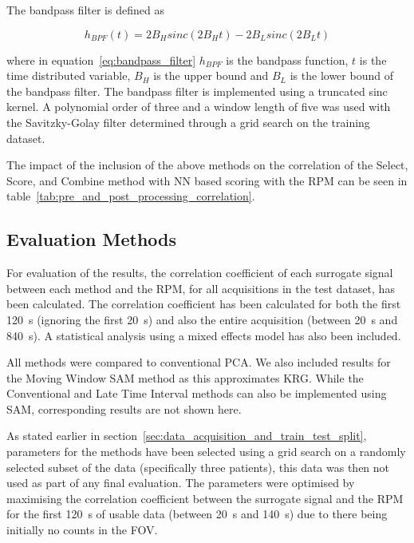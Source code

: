             The bandpass filter is defined as

            \begin{equation} \label{eq:bandpass_filter}
                h_{BPF}(t) = 2B_Hsinc(2B_Ht) - 2B_Lsinc(2B_Lt)
            \end{equation}

            \noindent where in equation~\ref{eq:bandpass_filter} $h_{BPF}$ is the bandpass function, $t$ is the time distributed variable, $B_H$ is the upper bound and $B_L$ is the lower bound of the bandpass filter. The bandpass filter is implemented using a truncated sinc kernel. A polynomial order of three and a window length of five was used with the Savitzky-Golay filter determined through a grid search on the training dataset.

        The impact of the inclusion of the above methods on the correlation of the Select, Score, and Combine method with \gls{NN} based scoring with the \gls{RPM} can be seen in table~\ref{tab:pre_and_post_processing_correlation}.

    \subsection{Evaluation Methods} \label{sec:evaluation_methods}        
        For evaluation of the results, the correlation coefficient of each surrogate signal between each method and the \gls{RPM}, for all acquisitions in the test dataset, has been calculated. The correlation coefficient has been calculated for both the first \SI{120}{\second} (ignoring the first \SI{20}{\second}) and also the entire acquisition (between \SI{20}{\second} and \SI{840}{\second}). A statistical analysis using a mixed effects model has also been included.
        
        All methods were compared to conventional \gls{PCA}. We also included results for the Moving Window \gls{SAM} method as this approximates \gls{KRG}.
        While the Conventional and Late Time Interval methods can also be implemented using \gls{SAM}, corresponding results are not shown here.

        As stated earlier in section~\ref{sec:data_acquisition_and_train_test_split}, parameters for the methods have been selected using a grid search on a randomly selected subset of the data (specifically three patients), this data was then not used as part of any final evaluation. The parameters were optimised by maximising the correlation coefficient between the surrogate signal and the \gls{RPM} for the first \SI{120}{\second} of usable data (between \SI{20}{\second} and \SI{140}{\second}) due to there being initially no counts in the \gls{FOV}.
            
